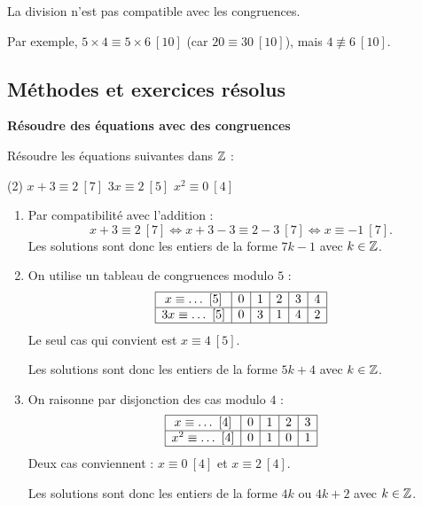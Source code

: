 \begin{attention}
	La division n'est pas compatible avec les congruences.

	Par exemple, $5 \times 4 \equiv 5 \times 6\ [10]$ (car $20 \equiv 30\ [10]$), mais $4 \not\equiv 6\ [10]$.
\end{attention}

\subsection{Méthodes et exercices résolus}

\exerciceresolu
\textbf{Résoudre des équations avec des congruences}

Résoudre les équations suivantes dans $\mathbb{Z}$ :
\begin{listecol}(2)
	\task $x + 3 \equiv 2\ [7]$
	\task $3x \equiv 2\ [5]$
	\task $x^2 \equiv 0\ [4]$
\end{listecol}

\solution

\begin{enumerate}
	\item Par compatibilité avec l'addition :
	$$
	x + 3 \equiv 2\ [7]
	\iff x + 3 - 3 \equiv 2 - 3\ [7]
	\iff x \equiv -1\ [7].
	$$
	Les solutions sont donc les entiers de la forme $7k - 1$ avec $k \in \mathbb{Z}$.

	\item On utilise un tableau de congruences modulo $5$ :
	\[
	\begin{array}{|c|c|c|c|c|c|}
		\hline
		x \equiv \ldots\ [5] & 0 & 1 & 2 & 3 & 4 \\
		\hline
		3x \equiv \ldots\ [5] & 0 & 3 & 1 & 4 & 2 \\
		\hline
	\end{array}
	\]
	Le seul cas qui convient est $x \equiv 4\ [5]$.

	Les solutions sont donc les entiers de la forme $5k + 4$ avec $k \in \mathbb{Z}$.

	\item On raisonne par disjonction des cas modulo $4$ :
	\[
	\begin{array}{|c|c|c|c|c|}
		\hline
		x \equiv \ldots\ [4] & 0 & 1 & 2 & 3 \\
		\hline
		x^2 \equiv \ldots\ [4] & 0 & 1 & 0 & 1 \\
		\hline
	\end{array}
	\]
	Deux cas conviennent : $x \equiv 0\ [4]$ et $x \equiv 2\ [4]$.

	Les solutions sont donc les entiers de la forme $4k$ ou $4k + 2$ avec $k \in \mathbb{Z}$.
\end{enumerate}


